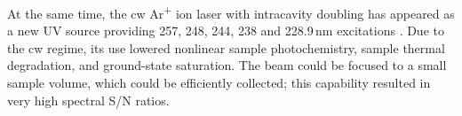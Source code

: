 At the same time, the cw Ar\textsuperscript{+} ion laser with intracavity
doubling has appeared as a new UV source providing 257, 248, 244, 238 and
228.9\,nm excitations
\parencite{%
	Asher1993b,%
	Russell1995%
}.
Due to the cw regime, its use lowered nonlinear sample photochemistry, sample
thermal degradation, and ground-state saturation.
The beam could be focused to a small sample volume, which could be efficiently
collected; this capability resulted in very high spectral S/N ratios.
